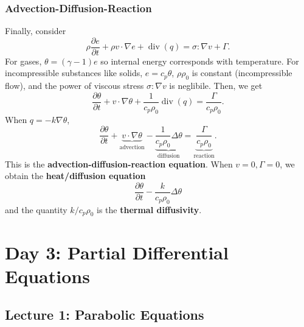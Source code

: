 \documentclass{article}
\theoremstyle{definition}
\theoremstyle{definition}
\begin{document}
\subsubsection{Advection-Diffusion-Reaction}
Finally, consider
$$\rho \frac{\partial e}{\partial t}+\rho v\cdot \nabla e+\operatorname{div}(q)=\sigma:\nabla v+\Gamma.$$
For gases, $\theta=(\gamma-1)e$ so internal energy corresponds with temperature. For incompressible substances like solids, $e=c_p\theta$, $\rho\rho_0$ is constant (incompressible flow), and the power of viscous stress $\sigma:\nabla v$ is neglibile. Then, we get
$$\frac{\partial \theta}{\partial t}+v\cdot \nabla \theta+\frac{1}{c_p\rho_0}\operatorname{div}(q)=\frac{\Gamma}{c_p\rho_0}.$$
When $q=-k\nabla \theta$,
$$\frac{\partial \theta}{\partial t}+\underbrace{v\cdot \nabla \theta}_{\text{advection}}-\underbrace{\frac{1}{c_p\rho_0}\Delta \theta}_{\text{diffusion}}=\underbrace{\frac{\Gamma}{c_p\rho_0}}_{\text{reaction}}.$$
This is the \textbf{advection-diffusion-reaction equation}. When $v=0,\Gamma=0$, we obtain the \textbf{heat/diffusion equation}
$$\frac{\partial \theta}{\partial t}-\frac{k}{c_p\rho_0}\Delta \theta$$
and the quantity $k/c_p\rho_0$ is the \textbf{thermal diffusivity}.

\section{Day 3: Partial Differential Equations}
\subsection{Lecture 1: Parabolic Equations}
\end{document}

